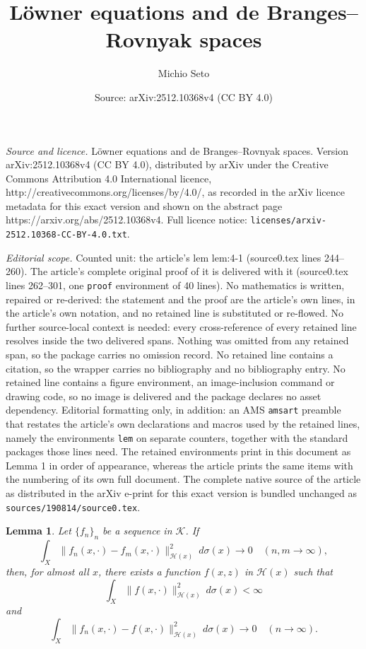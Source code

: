 \documentclass[10pt,a4paper]{amsart}
\title{L\"{o}wner equations and de Branges--Rovnyak spaces}
\author{Michio Seto}
\date{Source: arXiv:2512.10368v4 (CC BY 4.0)}
\newtheorem{lem}{Lemma}
\newcommand{\cH}{{\mathcal H}}
\newcommand{\cK}{{\mathcal K}}
\begin{document}
\maketitle

\noindent\emph{Source and licence.} L\"{o}wner equations and de Branges--Rovnyak spaces. Version arXiv:2512.10368v4 (CC BY 4.0), distributed by arXiv under the Creative Commons Attribution 4.0 International licence, http://creativecommons.org/licenses/by/4.0/, as recorded in the arXiv licence metadata for this exact version and shown on the abstract page https://arxiv.org/abs/2512.10368v4. Full licence notice: \texttt{licenses/arxiv-2512.10368-CC-BY-4.0.txt}.\par\smallskip

\noindent\textit{Editorial scope.} Counted unit: the article's lem lem:4-1 (source0.tex lines 244--260). The article's complete original proof of it is delivered with it (source0.tex lines 262--301, one \texttt{proof} environment of 40 lines). No mathematics is written, repaired or re-derived: the statement and the proof are the article's own lines, in the article's own notation, and no retained line is substituted or re-flowed.  No further source-local context is needed: every cross-reference of every retained line resolves inside the two delivered spans.  Nothing was omitted from any retained span, so the package carries no omission record.  No retained line contains a citation, so the wrapper carries no bibliography and no bibliography entry.  No retained line contains a figure environment, an image-inclusion command or drawing code, so no image is delivered and the package declares no asset dependency.  Editorial formatting only, in addition: an AMS \texttt{amsart} preamble that restates the article's own declarations and macros used by the retained lines, namely the environments \texttt{lem} on separate counters, together with the standard packages those lines need.  The retained environments print in this document as Lemma 1 in order of appearance, whereas the article prints the same items with the numbering of its own full document.  The complete native source of the article as distributed in the arXiv e-print for this exact version is bundled unchanged as \texttt{sources/190814/source0.tex}.
\begin{lem}\label{lem:4-1}
Let $\{f_n\}_n$ be a sequence in $\cK$. 
If 
\[
\int_X\|f_n(x,\cdot)-f_m(x,\cdot)\|_{\cH(x)}^2\ d\sigma(x)\to 0\quad(n,m\to \infty),
\] 
then, 
for almost all $x$,   
there exists a function $f(x, z)$ in $\cH(x)$ such that 
\[
\int_X\|f(x,\cdot)\|_{\cH(x)}^2\ d\sigma(x)<\infty
\]
and
\[
\int_X\|f_n(x,\cdot)-f(x,\cdot)\|_{\cH(x)}^2\ d\sigma(x)\to 0\quad(n\to \infty).
\] 
\end{lem}
\end{document}
